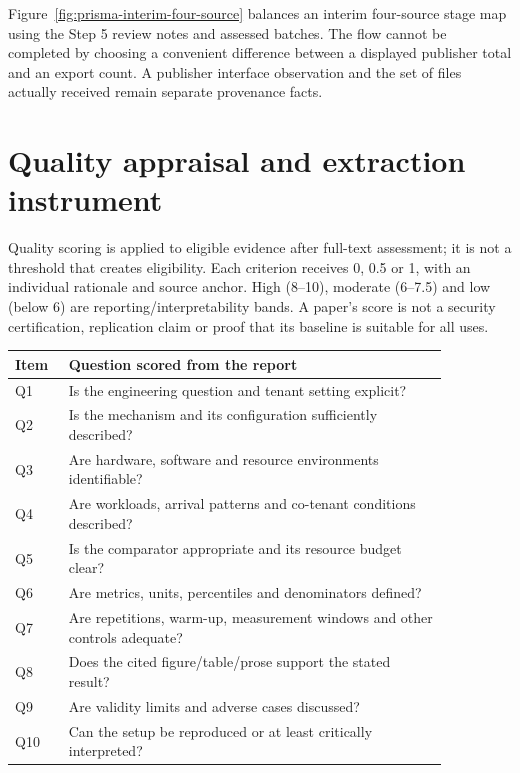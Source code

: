 Figure~\ref{fig:prisma-interim-four-source} balances an interim four-source stage map using the Step 5 review notes and assessed batches.  The flow cannot be completed by choosing a convenient difference between a displayed publisher total and an export count. A publisher interface observation and the set of files actually received remain separate provenance facts.

\section{Quality appraisal and extraction instrument}
\label{sec:instruments}
Quality scoring is applied to eligible evidence after full-text assessment; it is not a threshold that creates eligibility. Each criterion receives 0, 0.5 or 1, with an individual rationale and source anchor. High (8--10), moderate (6--7.5) and low (below 6) are reporting/interpretability bands. A paper's score is not a security certification, replication claim or proof that its baseline is suitable for all uses.

\begin{longtable}{P{0.10\linewidth}P{0.76\linewidth}}
\toprule Item & Question scored from the report\\\midrule\endhead
Q1 & Is the engineering question and tenant setting explicit?\\
Q2 & Is the mechanism and its configuration sufficiently described?\\
Q3 & Are hardware, software and resource environments identifiable?\\
Q4 & Are workloads, arrival patterns and co-tenant conditions described?\\
Q5 & Is the comparator appropriate and its resource budget clear?\\
Q6 & Are metrics, units, percentiles and denominators defined?\\
Q7 & Are repetitions, warm-up, measurement windows and other controls adequate?\\
Q8 & Does the cited figure/table/prose support the stated result?\\
Q9 & Are validity limits and adverse cases discussed?\\
Q10 & Can the setup be reproduced or at least critically interpreted?\\
\bottomrule\end{longtable}

